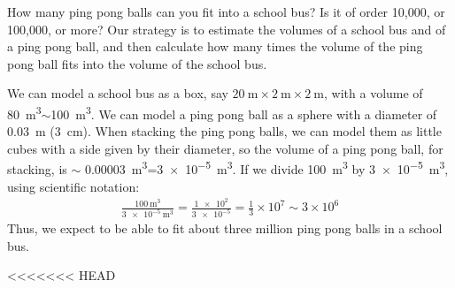 \begin{example}{How many ping pong balls can you fit into a school bus? Is it of order 10,000, or 100,000, or more?}
Our strategy is to estimate the volumes of a school bus and of a ping pong ball, and then calculate how many times the volume of the ping pong ball fits into the volume of the school bus.

We can model a school bus as a box, say $\SI{20}{\meter}\times \SI{2}{\meter}\times\SI{2}{\meter}$, with a volume of \SI{80}{\meter\cubed}$\sim$\SI{100}{\meter\cubed}. We can model a ping pong ball as a sphere with a diameter of \SI{0.03}{\meter} (\SI{3}{\centi\meter}). When stacking the ping pong balls, we can model them as little cubes with a side given by their diameter, so the volume of a ping pong ball, for stacking, is $\sim$ \SI{0.00003}{\meter\cubed}=\SI{3e-5}{\meter\cubed}. If we divide \SI{100}{\meter\cubed} by \SI{3e-5}{\meter\cubed}, using scientific notation:
\begin{align*}
\frac{\SI{100}{\meter\cubed}}{\SI{3e-5}{\meter\cubed}}=\frac{\num{1e2}}{\num{3e-5}}=\frac{1}{3}\times 10^7\sim 3\times 10^6
\end{align*}
Thus, we expect to be able to fit about three million ping pong balls in a school bus. 
\end{example}

<<<<<<< HEAD


